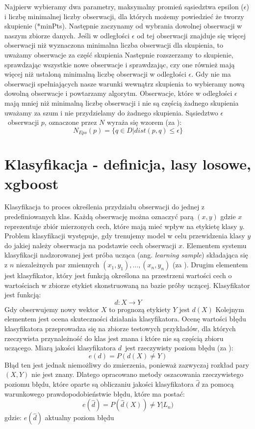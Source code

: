 \documentclass{amuthesis}
\begin{document}
Najpierw wybieramy dwa parametry, maksymalny promień sąsiedztwa epsilon (\(\epsilon\)) i liczbę minimalnej liczby obserwacji, dla których możemy powiedzieć że tworzy skupienie (*minPts).
Następnie zaczynamy od wybrania dowolnej obserwacji w naszym zbiorze danych.
Jeśli w odległości \(\epsilon\) od tej obserwacji znajduje się więcej obserwacji niż wyznaczona minimalna liczba obserwacji dla skupienia, to uważamy obserwacje za część skupienia
Następnie rozszerzamy to skupienie, sprawdzając wszystkie nowe obserwacje i sprawdzając, czy one również mają więcej niż ustaloną minimalną liczbę obserwacji w odległości \(\epsilon\).
Gdy nie ma obserwacji spełniających nasze warunki wewnątrz skupienia to wybieramy nową dowolną obserwacje i powtarzamy algorytm.
Obserwacje, które w odległości \(\epsilon\) mają mniej niż minimalną liczbę obserwacji i nie są częścią żadnego skupienia uważamy za szum i nie przydzielamy do żadnego skupienia.
Sąsiedztwo \(\epsilon\)~obserwacji \(p\), oznaczone przez \(N\) wyraża się wzorem (za \textcite{dbscan}):
\[N_{Eps} (p)= \{{q\in D|dist(p,q) \le \epsilon}\}
\]

\hypertarget{klasyfikacja}{%
\section{Klasyfikacja - definicja, lasy losowe, xgboost}\label{klasyfikacja}}

Klasyfikacja to proces określenia przydziału obserwacji do jednej z predefiniowanych klas.
Każdą obserwację można oznaczyć parą \((x,y)\) gdzie \(x\) reprezentuje zbiór mierzonych cech, które mają mieć wpływ na etykietę klasy \(y\).
Problem klasyfikacji występuje, gdy trenujemy model w celu przewidzenia klasy \(y\) do jakiej należy obserwacja na podstawie cech obserwacji \(x\).
Elementem systemu klasyfikacji nadzorowanej jest próba ucząca (ang. \emph{learning sample}) składająca się z \(n\) niezależnych par zmiennych \((x_1,y_1),\dots,(x_n,y_n)\) (za \textcite{gorecki}).
Drugim elementem jest klasyfikator, który jest funkcją określona na przestrzeni wartości cech o wartościach w zbiorze etykiet skonstruowaną na bazie próby uczącej. Klasyfikator jest funkcją:
\[ d: X\rightarrow Y\]
Gdy obserwujemy nowy wektor \(X\) to prognozą etykiety \(Y\) jest \(d( X )\)
Kolejnym elementem jest ocena skuteczności działania klasyfikatora.
Ocenę wartości błędu klasyfikatora przeprowadza się na zbiorze testowych przykładów, dla których rzeczywista przynależność do klas jest znana i które nie są częścią zbioru uczącego.
Miarą jakości klasyfikatora \(d\)~jest rzeczywisty poziom błędu (za \textcite{gorecki}):
\[ e(d) = P(d(X)\not=Y)
\]
Błąd ten jest jednak niemożliwy do zmierzenia, ponieważ zazwyczaj rozkład pary \((X,Y)\) nie jest znany.
Dlatego opracowano metody oszacowania rzeczywistego poziomu błędu, które oparte są obliczaniu jakości klasyfikatora \(\hat d\) za pomocą warunkowego prawdopodobieństwie błędu, które ma postać:
\[ e(\hat{d})=P(\hat d(X)) \not = Y| {\displaystyle L}_n)
\]
gdzie:
\(e(\hat d)\) aktualny poziom błędu
\end{document}
